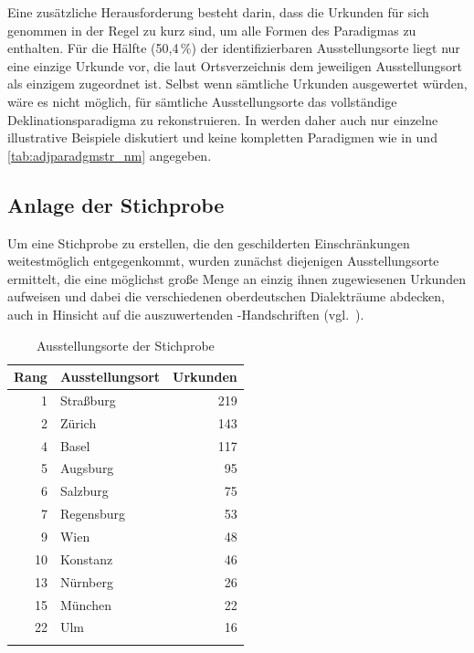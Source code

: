 Eine zusätzliche Herausforderung besteht darin, dass die Urkunden
für sich genommen in der Regel zu kurz sind, um alle Formen des Paradigmas zu
enthalten. Für die Hälfte (50,4\,\%) der identifizierbaren Ausstellungs\-orte
liegt nur eine einzige Urkunde vor, die laut Ortsverzeichnis dem jeweiligen
Ausstellungs\-ort als einzigem zugeordnet ist. Selbst wenn sämtliche Urkunden
ausgewertet würden, wäre es nicht möglich, für sämtliche Ausstellungs\-orte das
vollständige Deklinationsparadigma zu rekonstruieren. In
 werden daher auch nur einzelne illustrative
Beispiele diskutiert und keine kompletten Paradigmen wie in
 und \ref{tab:adjparadgmstr_nm} angegeben.


\subsection{Anlage der Stichprobe}
\label{subsec:cao_sample}

Um eine Stichprobe zu erstellen, die den geschilderten Einschränkungen
weitestmöglich entgegenkommt, wurden zunächst diejenigen Ausstellungs\-orte
ermittelt, die eine möglichst große Menge an einzig ihnen zugewiesenen
Urkunden aufweisen und dabei die verschiedenen oberdeutschen
Dialekt\-räume abdecken, auch in Hinsicht auf die auszuwertenden
\KC{}-Handschriften (vgl.~).

\begin{table}
\centering
\caption{Ausstellungsorte der Stichprobe}
\begin{tabular}{r l r}
\lsptoprule
Rang
	& Ausstellungs\-ort
	& Urkunden
	\\

\midrule

 1 & Straßburg  & 219 \\
 2 & Zürich     & 143 \\
 4 & Basel      & 117 \\
 5 & Augsburg   &  95 \\
 6 & Salzburg   &  75 \\
 7 & Regensburg &  53 \\
 9 & Wien       &  48 \\
10 & Konstanz	&  46 \\
13 & Nürnberg   &  26 \\
15 & München    &  22 \\
22 & Ulm        &  16 \\

\lspbottomrule
\end{tabular}
\label{tab:adjstpr_orte}
\end{table}

